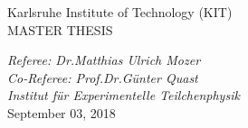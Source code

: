 \begin{titlepage}
\begin{addmargin}[1.5cm]{0cm}
\begin{center}
{  Karlsruhe Institute of Technology (KIT)\\
  \vspace{0.825 cm}
  \large{MASTER THESIS}\\
  \vspace{0.825 cm}

  \large{\textit{Referee: Dr.\;Matthias Ulrich Mozer}}\\
  \large{\textit{Co-Referee: Prof.\;Dr.\;G\"unter Quast}}\\
   \vspace{0.2 cm}
\large{\textit{Institut f\"ur Experimentelle Teilchenphysik}}\\


  \vspace{1.0cm}
  \large{September 03, 2018}%
}
\end{center}
\end{addmargin}
\end{titlepage}
